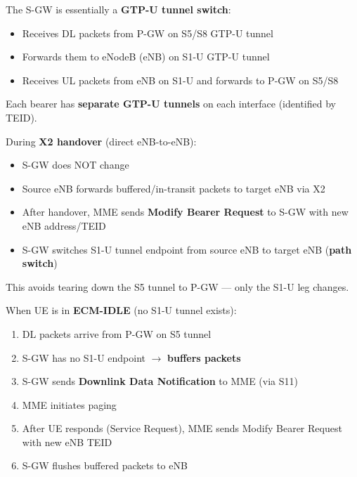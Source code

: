 
\CNchained{}

The S-GW is essentially a \textbf{GTP-U tunnel switch}:

\begin{itemize}
\tightlist
\item
  Receives DL packets from P-GW on S5/\allowbreak{}S8 GTP-U tunnel
\item
  Forwards them to eNodeB (eNB) on S1-U GTP-U tunnel
\item
  Receives UL packets from eNB on S1-U and forwards to P-GW on S5/\allowbreak{}S8
\end{itemize}

Each bearer has \textbf{separate GTP-U tunnels} on each interface (identified by TEID).


During \textbf{X2 handover} (direct eNB-to-eNB):

\begin{itemize}
\tightlist
\item
  S-GW does NOT change
\item
  Source eNB forwards buffered/\allowbreak{}in-transit packets to target eNB via X2
\item
  After handover, MME sends \textbf{Modify Bearer Request} to S-GW with new eNB address/\allowbreak{}TEID
\item
  S-GW switches S1-U tunnel endpoint from source eNB to target eNB (\textbf{path switch})
\end{itemize}

This avoids tearing down the S5 tunnel to P-GW — only the S1-U leg changes.


When UE is in \textbf{ECM-IDLE} (no S1-U tunnel exists):

\begin{enumerate}
\def\labelenumi{\arabic{enumi}.}
\tightlist
\item
  DL packets arrive from P-GW on S5 tunnel
\item
  S-GW has no S1-U endpoint \ensuremath{\to} \textbf{buffers packets}
\item
  S-GW sends \textbf{Downlink Data Notification} to MME (via S11)
\item
  MME initiates paging
\item
  After UE responds (Service Request), MME sends Modify Bearer Request with new eNB TEID
\item
  S-GW flushes buffered packets to eNB
\end{enumerate}

